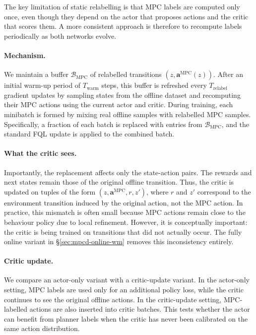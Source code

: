 The key limitation of static relabelling is that MPC labels are computed
only once, even though they depend on the actor that proposes actions
and the critic that scores them. A more consistent approach is therefore
to recompute labels periodically as both networks evolve.

\paragraph{Mechanism.}
We maintain a buffer $\mathcal{B}_{\text{MPC}}$ of relabelled
transitions $(z, \mathbf{a}^{\text{MPC}}(z))$. After an initial warm-up
period of $T_{\text{warm}}$ steps, this buffer is refreshed every
$T_{\text{relabel}}$ gradient updates by sampling states from the
offline dataset and recomputing their MPC actions using the current
actor and critic.
During training, each minibatch is formed by mixing real offline
samples with relabelled MPC samples. Specifically, a fraction of each
batch is replaced with entries from $\mathcal{B}_{\text{MPC}}$, and
the standard FQL update is applied to the combined batch.

\paragraph{What the critic sees.}
Importantly, the replacement affects only the state-action pairs. The
rewards and next states remain those of the original offline
transition. Thus, the critic is updated on tuples of the form
$(z, \mathbf{a}^{\text{MPC}}, r, z')$, where $r$ and $z'$ correspond
to the environment transition induced by the original action, not the
MPC action.
In practice, this mismatch is often small because MPC actions remain
close to the behaviour policy due to local refinement. However, it is
conceptually important: the critic is being trained on transitions
that did not actually occur. The fully online variant in
\S\ref{sec:mpcd-online-wm} removes this inconsistency entirely.

\paragraph{Critic update.}
We compare an actor-only variant with a critic-update variant. In the
actor-only setting, MPC labels are used only for an additional policy
loss, while the critic continues to see the original offline actions. In
the critic-update setting, MPC-labelled actions are also inserted into
critic batches. This tests whether the actor can benefit from planner
labels when the critic has never been calibrated on the same action
distribution.

